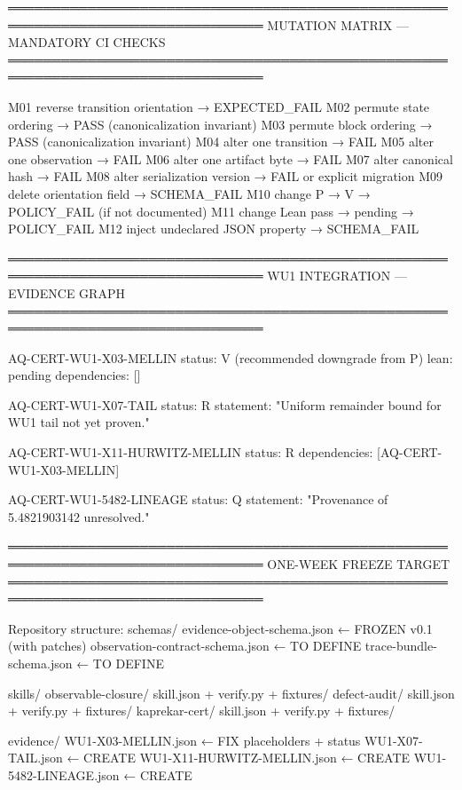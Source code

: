 ═══════════════════════════════════════════════════════════════════════════════
MUTATION MATRIX — MANDATORY CI CHECKS
═══════════════════════════════════════════════════════════════════════════════

M01  reverse transition orientation     → EXPECTED_FAIL
M02  permute state ordering              → PASS (canonicalization invariant)
M03  permute block ordering              → PASS (canonicalization invariant)
M04  alter one transition                → FAIL
M05  alter one observation               → FAIL
M06  alter one artifact byte             → FAIL
M07  alter canonical hash                → FAIL
M08  alter serialization version         → FAIL or explicit migration
M09  delete orientation field            → SCHEMA_FAIL
M10  change P → V                         → POLICY_FAIL (if not documented)
M11  change Lean pass → pending           → POLICY_FAIL
M12  inject undeclared JSON property     → SCHEMA_FAIL

═══════════════════════════════════════════════════════════════════════════════
WU1 INTEGRATION — EVIDENCE GRAPH
═══════════════════════════════════════════════════════════════════════════════

AQ-CERT-WU1-X03-MELLIN
  status: V (recommended downgrade from P)
  lean: pending
  dependencies: []
  
AQ-CERT-WU1-X07-TAIL
  status: R
  statement: "Uniform remainder bound for WU1 tail not yet proven."
  
AQ-CERT-WU1-X11-HURWITZ-MELLIN
  status: R
  dependencies: [AQ-CERT-WU1-X03-MELLIN]
  
AQ-CERT-WU1-5482-LINEAGE
  status: Q
  statement: "Provenance of 5.4821903142 unresolved."

═══════════════════════════════════════════════════════════════════════════════
ONE-WEEK FREEZE TARGET
═══════════════════════════════════════════════════════════════════════════════

Repository structure:
  schemas/
    evidence-object-schema.json          ← FROZEN v0.1 (with patches)
    observation-contract-schema.json      ← TO DEFINE
    trace-bundle-schema.json              ← TO DEFINE
  
  skills/
    observable-closure/
      skill.json + verify.py + fixtures/
    defect-audit/
      skill.json + verify.py + fixtures/
    kaprekar-cert/
      skill.json + verify.py + fixtures/
  
  evidence/
    WU1-X03-MELLIN.json                   ← FIX placeholders + status
    WU1-X07-TAIL.json                     ← CREATE
    WU1-X11-HURWITZ-MELLIN.json           ← CREATE
    WU1-5482-LINEAGE.json                 ← CREATE
  
